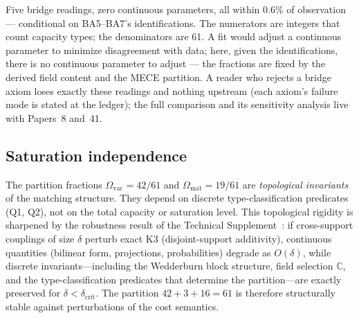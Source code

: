 \documentclass[11pt]{article}
\begin{document}
Five bridge readings, zero continuous parameters, all within $0.6\%$
of observation --- conditional on BA5--BA7's identifications.  The
numerators are integers that count capacity types; the denominators
are 61.  A fit would adjust a continuous parameter to minimize
disagreement with data; here, given the identifications, there is no
continuous parameter to adjust --- the fractions are fixed by the
derived field content and the MECE partition.  A reader who rejects a
bridge axiom loses exactly these readings and nothing upstream (each
axiom's failure mode is stated at the ledger); the full comparison
and its sensitivity analysis live with Papers~8 and~41.

\subsection{Saturation independence}

The partition fractions $\Omega_{\mathrm{vac}} = 42/61$ and $\Omega_{\mathrm{mat}} = 19/61$ are \emph{topological invariants} of the matching structure.  They depend on discrete type-classification predicates (Q1, Q2), not on the total capacity or saturation level.  This topological rigidity is sharpened by the robustness result of the Technical Supplement~\cite{BrookeSupplement}: if cross-support couplings of size $\delta$ perturb exact K3 (disjoint-support additivity), continuous quantities (bilinear form, projections, probabilities) degrade as $O(\delta)$, while discrete invariants---including the Wedderburn block structure, field selection $\mathbb{C}$, and the type-classification predicates that determine the partition---are exactly preserved for $\delta < \delta_{\mathrm{crit}}$.  The partition $42 + 3 + 16 = 61$ is therefore structurally stable against perturbations of the cost semantics.
\end{document}
